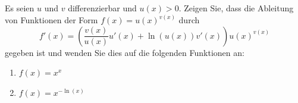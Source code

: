 \begin{ExerciseBlock}
Es seien $u$ und $v$ differenzierbar und $u(x)>0$. Zeigen Sie, dass die Ableitung von Funktionen der Form $f(x) = u(x)^{v(x)}$ durch  
\begin{equation*}
	f'(x) = \left( \frac{v(x)}{u(x)} u'(x) + \ln(u(x)) v'(x) \right) u(x)^{v(x)}
\end{equation*}
gegeben ist und wenden Sie dies auf die folgenden Funktionen an:
\begin{enumerate}[label=\alph*)]
	\item $f(x) = x^x$
	\item $f(x) = x^{-\ln(x)}$
\end{enumerate}

\end{ExerciseBlock}

